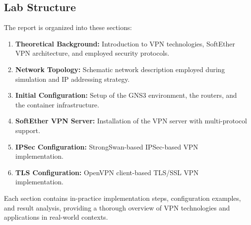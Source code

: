 \subsection{Lab Structure}

The report is organized into these sections:

\begin{enumerate}
    \item \textbf{Theoretical Background:} Introduction to VPN technologies, SoftEther VPN architecture, and employed security protocols.
    
    \item \textbf{Network Topology:} Schematic network description employed during simulation and IP addressing strategy.
    
    \item \textbf{Initial Configuration:} Setup of the GNS3 environment, the routers, and the container infrastructure.
    
    \item \textbf{SoftEther VPN Server:} Installation of the VPN server with multi-protocol support.
    
    \item \textbf{IPSec Configuration:} StrongSwan-based IPSec-based VPN implementation.
    
    \item \textbf{TLS Configuration:} OpenVPN client-based TLS/SSL VPN implementation.
        
\end{enumerate}

Each section contains in-practice implementation steps, configuration examples, and result analysis, providing a thorough overview of VPN technologies and applications in real-world contexts.

